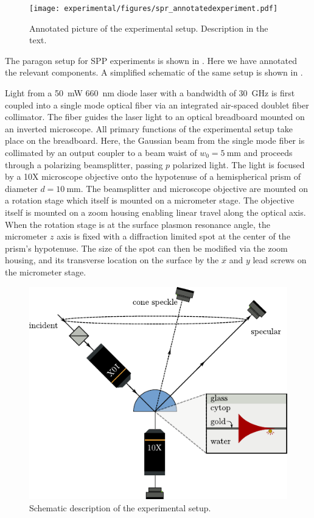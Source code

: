\begin{figure}[ht]
 \centering
 \texttt{[image: experimental/figures/spr\_annotatedexperiment.pdf]}
 \caption{Annotated picture of the experimental setup.  Description in the
	text.}
 \label{fig:experimentalpicture}
\end{figure}

The paragon setup for SPP experiments is shown in
.  Here we have annotated the relevant
components.  A simplified schematic of the same setup is shown in
.

Light from a \SI{50}{\milli\watt} \SI{660}{\nano\meter} diode laser with a
bandwidth of \SI{30}{\giga\hertz} is first coupled into a single mode
optical fiber via an integrated air-spaced doublet fiber collimator.  The
fiber guides the laser light to an optical breadboard mounted on an
inverted microscope.  All primary functions of the experimental setup take
place on the breadboard.  Here, the Gaussian beam from the single mode
fiber is collimated by an output coupler to a beam waist of
$w_0=\SI{5}{\milli\meter}$ and proceeds through a polarizing beamsplitter,
passing $p$ polarized light.  The light is focused by a 10X microscope
objective onto the hypotenuse of a hemispherical prism of diameter
$d=\SI{10}{\milli\meter}$.  The beamsplitter and microscope objective are
mounted on a rotation stage which itself is mounted on a micrometer stage.
The objective itself is mounted on a zoom housing enabling linear travel
along the optical axis.  When the rotation stage is at the surface plasmon
resonance angle, the micrometer $z$ axis is fixed with a diffraction
limited spot at the center of the prism's hypotenuse.  The size of the spot
can then be modified via the zoom housing, and its transverse location on
the surface by the $x$ and $y$ lead screws on the micrometer stage.  
\begin{figure}[ht]
\centering
 \includegraphics[keepaspectratio]{experimental/figures/conefig.pdf}
	\caption{Schematic description of the experimental setup.}
 \label{fig:experimentalsetup}
\end{figure}

